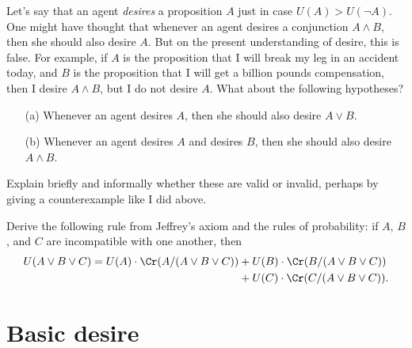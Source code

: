 \begin{exercise}{2}
  Let's say that an agent \emph{desires} a proposition $A$ just in
  case $U(A) > U(\neg A)$. One might have thought that whenever an
  agent desires a conjunction $A \land B$, then she should also desire
  $A$. But on the present understanding of desire, this is false. For
  example, if $A$ is the proposition that I will break my leg in an
  accident today, and $B$ is the proposition that I will get a billion
  pounds compensation, then I desire $A \land B$, but I do not desire
  $A$. What about the following hypotheses?
  \begin{enumerate}
  \item[(a)] Whenever an agent desires $A$, then she should also desire $A
    \lor B$.
  \item[(b)] Whenever an agent desires $A$ and desires $B$, then she
    should also desire $A \land B$.
  \end{enumerate}
  Explain briefly and informally whether these are valid or invalid,
  perhaps by giving a counterexample like I did above. 

\end{exercise}

\begin{exercise}{3}
  Derive the following rule from Jeffrey's axiom and the rules of probability: 
  if $A$, $B$, and $C$ are incompatible with one another, then 
  \begin{align*} U(A \lor B \lor C) =
  U(A)\cdot \Cr(A/(A\lor B \lor C)) &+ U(B)\cdot \Cr(B/(A \lor B \lor C))\\
  &+ U(C)\cdot\Cr(C/(A \lor B\lor C)).
  \end{align*}
\end{exercise}


\section{Basic desire}\label{sec:basic-desire}



